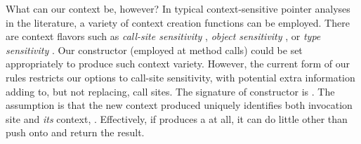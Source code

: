 What can our context be, however? In typical context-sensitive pointer
analyses in the literature, a variety of context creation functions
can be employed. There are context flavors such as \emph{call-site
  sensitivity} \cite{Sharir:Interprocedural,shivers:thesis},
\emph{object sensitivity}
\cite{Milanova:2002:POS:566172.566174,1044835}, or \emph{type
  sensitivity} \cite{popl/SmaragdakisBL11}. Our 
constructor (employed at method calls) could be set appropriately to
produce such context variety. However, the current form of our rules
restricts our options to call-site sensitivity, with potential extra
information adding to, but not replacing, call sites. The signature of
constructor  is . The assumption is that the new context produced
uniquely identifies both invocation site  and \emph{its}
context, . Effectively, if  produces a
 at all, it can do little other than push 
onto  and return the result.


